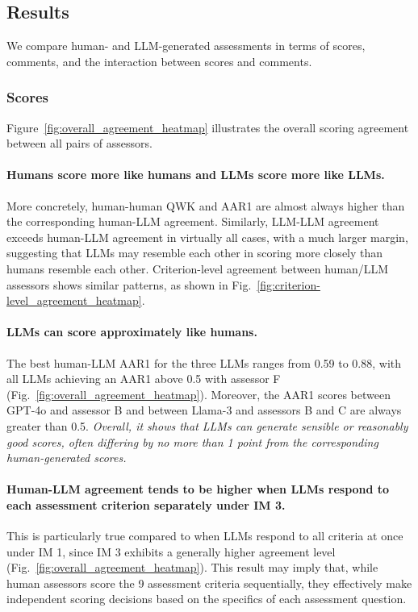 \subsection{Results}

We compare human- and LLM-generated assessments in terms of scores, comments, and the interaction between scores and comments.

\subsubsection{Scores\label{sec:scores}}

Figure~\ref{fig:overall_agreement_heatmap} illustrates the overall scoring agreement between all pairs of assessors. 

\paragraph{Humans score more like humans and LLMs score more like LLMs.} More concretely, human-human QWK and AAR1 are almost always higher than the corresponding human-LLM agreement. Similarly, LLM-LLM agreement exceeds human-LLM agreement in virtually all cases, with a much larger margin, suggesting that LLMs may resemble each other in scoring more closely than humans resemble each other. Criterion-level agreement between human/LLM assessors shows similar patterns, as shown in Fig.~\ref{fig:criterion-level_agreement_heatmap}.


\paragraph{LLMs can score approximately like humans.} The best human-LLM AAR1 for the three LLMs ranges from 0.59 to 0.88, with all LLMs achieving an AAR1 above 0.5 with assessor F (Fig.~\ref{fig:overall_agreement_heatmap}). Moreover, the AAR1 scores between GPT-4o and assessor B and between Llama-3 and assessors B and C are always greater than 0.5. \textit{Overall, it shows that LLMs can generate sensible or reasonably good scores, often differing by no more than 1 point from the corresponding human-generated scores.}


\paragraph{Human-LLM agreement tends to be higher when LLMs respond to each assessment criterion separately under IM 3.} This is particularly true compared to when LLMs respond to all criteria at once under IM 1, since IM 3 exhibits a generally higher agreement level (Fig.~\ref{fig:overall_agreement_heatmap}). This result may imply that, while human assessors score the 9 assessment criteria sequentially, they effectively make independent scoring decisions based on the specifics of each assessment question. 

